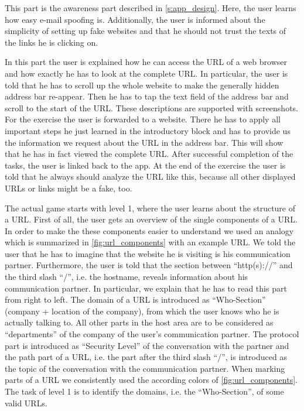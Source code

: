 \begin{description}[leftmargin=0cm]
	\item[Introduction Part 1:] This part is the awareness part described in \autoref{s:app_design}. Here, the user learns how easy e-mail spoofing is.
 Additionally, the user is informed about the simplicity of setting up fake websites and that he should not trust the texts of the links he is clicking on.

	\item[Introduction Part 2:] In this part the user is explained how he can access the URL of a web browser and how exactly he has to look at the complete URL.
 In particular, the user is told that he has to scroll up the whole website to make the generally hidden address bar re-appear.
 Then he has to tap the text field of the address bar and scroll to the start of the URL.
These descriptions are supported with screenshots.
For the exercise the user is forwarded to a website.
There he has to apply all important steps he just learned in the introductory block and has to provide us the information we request about the URL in the address bar.
 This will show that he has in fact viewed the complete URL.
After successful completion of the tasks, the user is linked back to the app.
 At the end of the exercise the user is told that he always should analyze the URL like this, because all other displayed URLs or links might be a fake, too.

	\item[Level 1:] The actual game starts with level 1, where the user learns about the structure of a URL.
 First of all, the user gets an overview of the single components of a URL.
 In order to make the these components easier to understand we used an analogy which is summarized in \autoref{fig:url_components} with an example URL.
 We told the user that he has to imagine that the website he is visiting is his communication partner.
 Furthermore, the user is told that the section between ``http(s)://'' and the third slash ``/'', i.e. the hostname, reveals information about his communication partner.
 In particular, we explain that he has to read this part from right to left.
 The domain of a URL is introduced as ``Who-Section'' (company + location of the company), from which the user knows who he is actually talking to.
 All other parts in the host area are to be considered as ``departments'' of the company of the user's communication partner.
 The protocol part is introduced as ``Security Level'' of the conversation with the partner and the path part of a URL, i.e. the part after the third slash ``/'', is introduced as the topic of the conversation with the communication partner.
 When marking parts of a URL we consistently used the according colors of \autoref{fig:url_components}. 
The task of level 1 is to identify the domains, i.e. the ``Who-Section'', of some valid URLs.


\end{description}
